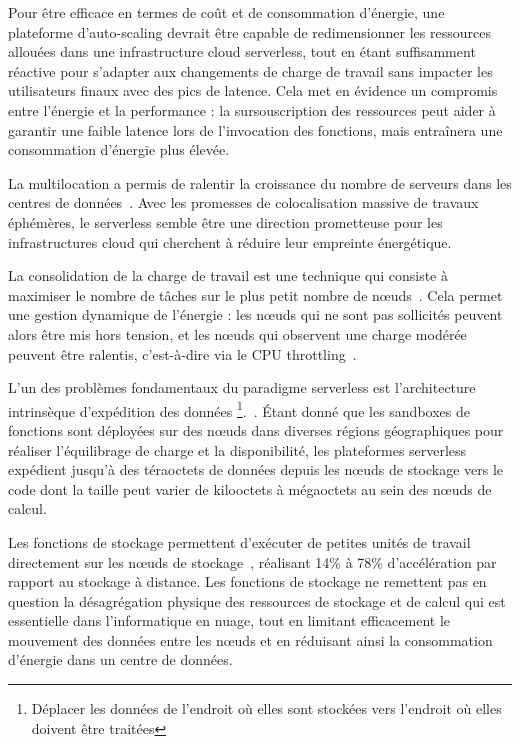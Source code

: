 Pour être efficace en termes de coût et de consommation d'énergie, une plateforme d'auto-scaling devrait être capable de redimensionner les ressources allouées dans une infrastructure cloud serverless, tout en étant suffisamment réactive pour s'adapter aux changements de charge de travail sans impacter les utilisateurs finaux avec des pics de latence. Cela met en évidence un compromis entre l'énergie et la performance : la sursouscription des ressources peut aider à garantir une faible latence lors de l'invocation des fonctions, mais entraînera une consommation d'énergie plus élevée.

La multilocation a permis de ralentir la croissance du nombre de serveurs dans les centres de données~\cite{masanetRecalibratingGlobalData2020}. Avec les promesses de colocalisation massive de travaux éphémères, le serverless semble être une direction prometteuse pour les infrastructures cloud qui cherchent à réduire leur empreinte énergétique.

La consolidation de la charge de travail est une technique qui consiste à maximiser le nombre de tâches sur le plus petit nombre de nœuds~\cite{chaurasiaComprehensiveSurveyEnergyaware2021}. Cela permet une gestion dynamique de l'énergie : les nœuds qui ne sont pas sollicités peuvent alors être mis hors tension, et les nœuds qui observent une charge modérée peuvent être ralentis, c'est-à-dire via le CPU throttling~\cite{liuHierarchicalFrameworkCloud2017}.

L'un des problèmes fondamentaux du paradigme serverless est l'architecture intrinsèque d'expédition des données \footnote{Déplacer les données de l'endroit où elles sont stockées vers l'endroit où elles doivent être traitées}.~\cite{chikhaouiMultiobjectiveOptimizationData2021a}. Étant donné que les sandboxes de fonctions sont déployées sur des nœuds dans diverses régions géographiques pour réaliser l'équilibrage de charge et la disponibilité, les plateformes serverless expédient jusqu'à des téraoctets de données depuis les nœuds de stockage vers le code dont la taille peut varier de kilooctets à mégaoctets au sein des nœuds de calcul.

Les fonctions de stockage permettent d'exécuter de petites unités de travail directement sur les nœuds de stockage~\cite{zhangNarrowingGapServerless2019}, réalisant 14\% à 78\% d'accélération par rapport au stockage à distance. Les fonctions de stockage ne remettent pas en question la désagrégation physique des ressources de stockage et de calcul qui est essentielle dans l'informatique en nuage, tout en limitant efficacement le mouvement des données entre les nœuds et en réduisant ainsi la consommation d'énergie dans un centre de données.

